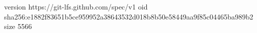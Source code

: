 version https://git-lfs.github.com/spec/v1
oid sha256:e1882f83651b5ce959952a38643532d018b8b50e58449aa9f85c04465ba989b2
size 5566
